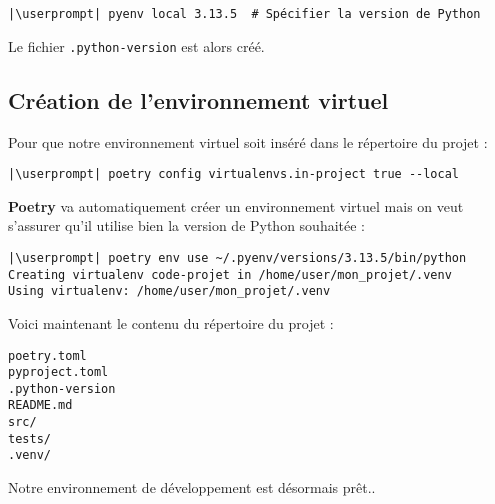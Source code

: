 \begin{lstlisting}[style=bash]
|\userprompt| pyenv local 3.13.5  # Spécifier la version de Python
\end{lstlisting}

Le fichier \texttt{.python-version} est alors créé.

\subsection*{Création de l'environnement virtuel}
Pour que notre environnement virtuel soit inséré dans le répertoire du projet :
\begin{lstlisting}[style=bash]
|\userprompt| poetry config virtualenvs.in-project true --local
\end{lstlisting}

\textbf{Poetry} va automatiquement créer un environnement virtuel mais on veut s’assurer qu’il utilise bien la version de Python souhaitée :
\begin{lstlisting}[style=bash]
|\userprompt| poetry env use ~/.pyenv/versions/3.13.5/bin/python
Creating virtualenv code-projet in /home/user/mon_projet/.venv
Using virtualenv: /home/user/mon_projet/.venv
\end{lstlisting}

Voici maintenant le contenu du répertoire du projet :
\begin{verbatim}
poetry.toml
pyproject.toml
.python-version
README.md  
src/  
tests/  
.venv/
\end{verbatim}

Notre environnement de développement est désormais prêt..
